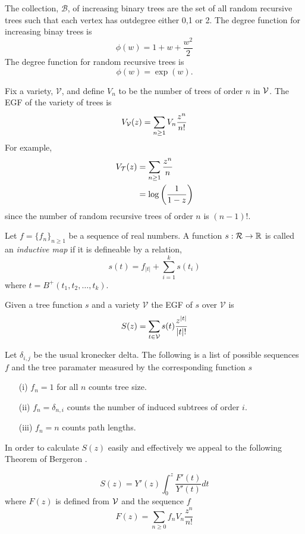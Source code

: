 \begin{ex}\label{ex:inductivemaps}
 The collection, $\mathcal{B}$, of increasing binary trees are the set of all random recursive trees such that each vertex has 
 outdegree either 0,1 or 2.  The degree function for increasing binay trees is
 \[
  \phi(w) = 1 + w + \frac{w^2}{2}
 \]
The degree function for random recursive trees is
\[
 \phi(w) = \exp(w).
\]
\end{ex}
Fix a variety, $\mathcal{V}$, and define $V_n$ to be the number of trees of order $n$ in $\operatorname{\mathcal{V}}$.  The EGF of the variety of trees 
is 
\[
 V_{\operatorname{\mathcal{V}}}(z) = \sum_{n \geq 1} V_n \frac{z^n}{n!}
\]
For example, 
\begin{align}
V_{\operatorname{\mathcal{T}}}(z) &= \sum_{n\geq 1} \frac{z^n}{n} \\
&= \log\left( \frac{1}{1-z}\right)
\end{align}
since the number of random recursive trees of order $n$ is $(n-1)!$.

\begin{defn}
Let $f = \{f_n\}_{n\geq 1}$ be a sequence of real numbers.  A function $s: \operatorname{\mathcal{R}} \rightarrow \mathbb{R}$ is called an 
\emph{inductive map} if it is defineable by a relation,
\[
 s(t) = f_{\lvert t \rvert} + \sum_{i=1}^k s(t_i)
\]
where $t = B^{+}(t_1,t_2,\dots,t_k)$.
\end{defn}
Given a tree function $s$ and a variety $\mathcal{V}$ the EGF of $s$ over $\mathcal{V}$ is 
\[
 S(z) = \sum_{t \in \operatorname{\mathcal{V}}} s(t) \frac{z^{\lvert t \rvert}}{\lvert t \rvert !}
\]
\begin{ex}
 Let $\delta_{i,j}$ be the usual kronecker delta. The following is a list of possible sequences $f$ and the tree paramater 
 measured by the corresponding function $s$
 \begin{itemize}
  \item[(i)]   $f_n = 1$ for all $n$ counts tree size.
  \item[(ii)] $f_n = \delta_{n,i}$ counts the number of induced subtrees of order $i$.
  \item[(iii)] $f_n = n$ counts path lengths.
 \end{itemize}
 \end{ex}

In order to calculate $S(z)$ easily and effectively we appeal to the following Theorem of Bergeron \cite{Bergeron}.
\begin{thm}\label{thm:inductivemaps}
 \[
 S(z) = Y'(z) \int_{0}^{z} \frac{F'(t)}{Y'(t)} dt
 \]
where $F(z)$ is defined from $\operatorname{\mathcal{V}}$ and the sequence $f$
\[
 F(z) = \sum_{n \geq 0} f_n V_n \frac{z^n}{n!}
\]
\end{thm}

